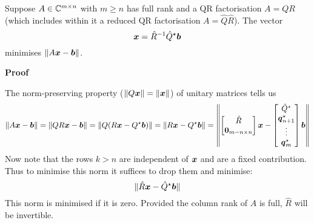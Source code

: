 \begin{example}[QR by hand]
\begin{theorem} Suppose $A \in {\mathbb C}^{m \times n}$ with $m \ensuremath{\geq} n$ has full rank and a QR factorisation $A = Q R$ (which includes within it a reduced QR factorisation $A = \hat Q \hat R$). The vector
\[
\bm{{\mbox{\boldmath$x$\unboldmath}}} = \hat R^{-1} \hat Q^\star \bm{{\mbox{\boldmath$b$\unboldmath}}}
\]
minimises $\| A \bm{{\mbox{\boldmath$x$\unboldmath}}} - \bm{{\mbox{\boldmath$b$\unboldmath}}} \|$. 

\end{theorem}
\textbf{Proof}

The norm-preserving property ($\|Q\bm{{\mbox{\boldmath$x$\unboldmath}}}\| = \|\bm{{\mbox{\boldmath$x$\unboldmath}}}\|$) of unitary matrices tells us
\[
\| A \bm{{\mbox{\boldmath$x$\unboldmath}}} - \bm{{\mbox{\boldmath$b$\unboldmath}}} \| = \| Q R \bm{{\mbox{\boldmath$x$\unboldmath}}} - \bm{{\mbox{\boldmath$b$\unboldmath}}} \| = \| Q (R \bm{{\mbox{\boldmath$x$\unboldmath}}} - Q^\star \bm{{\mbox{\boldmath$b$\unboldmath}}}) \| = \| R \bm{{\mbox{\boldmath$x$\unboldmath}}} - Q^\star \bm{{\mbox{\boldmath$b$\unboldmath}}} \| = \left \| 
\begin{bmatrix} \hat R \\ \bm{{\mbox{\boldmath$0$\unboldmath}}}_{m-n \times n} \end{bmatrix} \bm{{\mbox{\boldmath$x$\unboldmath}}} - \begin{bmatrix} \hat Q^\star \\ \bm{{\mbox{\boldmath$q$\unboldmath}}}_{n+1}^\star \\ \vdots \\ \bm{{\mbox{\boldmath$q$\unboldmath}}}_m^\star \end{bmatrix}     \bm{{\mbox{\boldmath$b$\unboldmath}}} \right \|
\]
Now note that the rows $k > n$ are independent of $\bm{{\mbox{\boldmath$x$\unboldmath}}}$ and are a fixed contribution. Thus to minimise this norm it suffices to drop them and minimise:
\[
\| \hat R \bm{{\mbox{\boldmath$x$\unboldmath}}} - \hat Q^\star \bm{{\mbox{\boldmath$b$\unboldmath}}} \|
\]
This norm is minimised if it is zero. Provided the column rank of $A$ is full, $\hat R$ will be invertible.

\end{example}



